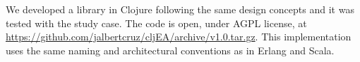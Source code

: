 
We developed a library in Clojure following the same design concepts and it was tested with the study case. The code is open, under AGPL license, at
\url{https://github.com/jalbertcruz/cljEA/archive/v1.0.tar.gz}. This implementation uses the same naming and architectural conventions as in Erlang and Scala.
